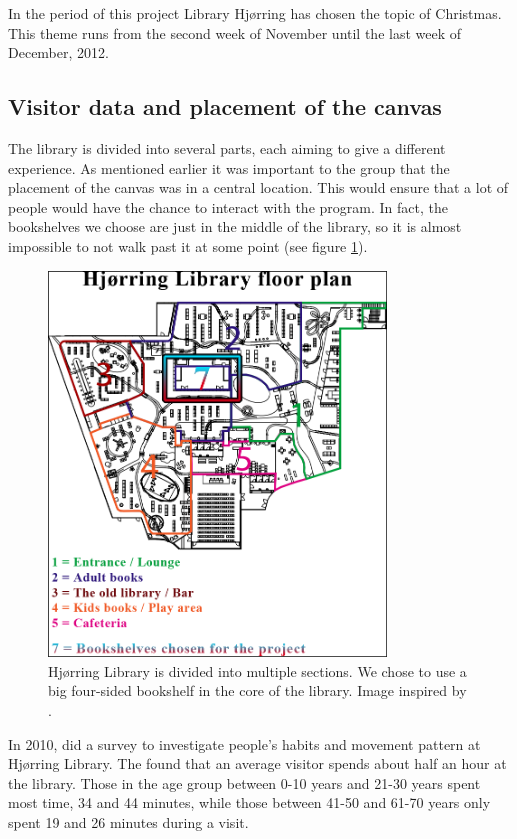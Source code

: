In the period of this project Library Hj{\o}rring has chosen the topic of Christmas. This theme runs from the second week of November until the last week of December, 2012.

\subsection{Visitor data and placement of the canvas}
The library is divided into several parts, each aiming to give a different experience. As mentioned earlier it was important to the group that the placement of the canvas was in a central location. This would ensure that a lot of people would have the chance to interact with the program. In fact, the bookshelves we choose are just in the middle of the library, so it is almost impossible to not walk past it at some point (see figure \ref{fig:library_floorplans}).

\begin{figure}[htbp]
\centering
\includegraphics[width=0.80\textwidth]{Pictures/HjoerringLibrary/hjoerring_library_floorplans.png}
\caption{Hj{\o}rring Library is divided into multiple sections. We chose to use a big four-sided bookshelf in the core of the library. Image inspired by \citep{hjoerring_study}.}
\label{fig:library_floorplans}
\end{figure}

In 2010, \citep{hjoerring_study} did a survey to investigate people's habits and movement pattern at Hj{\o}rring Library. The found that an average visitor spends about half an hour at the library. Those in the age group between 0-10 years and 21-30 years spent most time, 34 and 44 minutes, while those between 41-50 and 61-70 years only spent 19 and 26 minutes during a visit.

